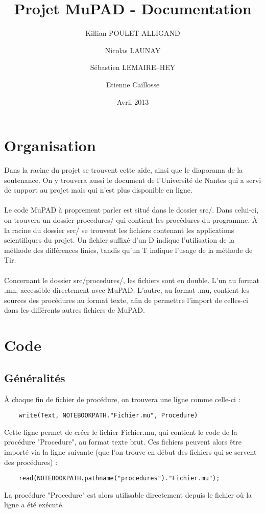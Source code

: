 \documentclass{report}
\title{Projet MuPAD - Documentation}
\author{Killian POULET-ALLIGAND \and Nicolas LAUNAY \and Sébastien LEMAIRE--HEY \and Etienne Caillosse}
\date{Avril 2013}
\begin{document}
\maketitle
\chapter{Organisation}
Dans la racine du projet se trouvent cette aide, ainsi que le diaporama de la soutenance. On y trouvera aussi le document de l'Université de Nantes qui a servi de support au projet mais qui n'est plus disponible en ligne.
\\
\\	
Le code MuPAD à proprement parler est situé dans le dossier src/. Dans celui-ci, on trouvera un dossier procedures/ qui contient les procédures du programme. À la racine du dossier src/ se trouvent les fichiers contenant les applications scientifiques du projet. Un fichier suffixé d'un D indique l'utilisation de la méthode des différences finies, tandis qu'un T indique l'usage de la méthode de Tir.
\\
\\
Concernant le dossier src/procedures/, les fichiers sont en double. L'un au format .mn, accessible directement avec MuPAD. L'autre, au format .mu, contient les sources des procédures au format texte, afin de permettre l'import de celles-ci dans les différents autres fichiers de MuPAD. 

\chapter{Code}
\section{Généralités}
À chaque fin de fichier de procédure, on trouvera une ligne comme celle-ci : 
\begin{verbatim}
	write(Text, NOTEBOOKPATH."Fichier.mu", Procedure)
\end{verbatim}

Cette ligne permet de créer le fichier Fichier.mu, qui contient le code de la procédure "Procedure", au format texte brut. Ces fichiers peuvent alors être importé via la ligne suivante (que l'on trouve en début des fichiers qui se servent des procédures) : 
\begin{verbatim}
	read(NOTEBOOKPATH.pathname("procedures")."Fichier.mu");	
\end{verbatim}

La procédure "Procedure" est alors utilisable directement depuis le fichier où la ligne a été exécuté.
\end{document}
